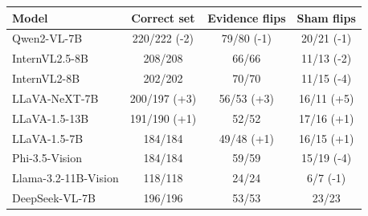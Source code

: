\begin{tabular}{@{}lccc@{}}
\toprule
Model & Correct set & Evidence flips & Sham flips \\
\midrule
Qwen2-VL-7B & 220/222 (-2) & 79/80 (-1) & 20/21 (-1) \\
InternVL2.5-8B & 208/208 & 66/66 & 11/13 (-2) \\
InternVL2-8B & 202/202 & 70/70 & 11/15 (-4) \\
LLaVA-NeXT-7B & 200/197 (+3) & 56/53 (+3) & 16/11 (+5) \\
LLaVA-1.5-13B & 191/190 (+1) & 52/52 & 17/16 (+1) \\
LLaVA-1.5-7B & 184/184 & 49/48 (+1) & 16/15 (+1) \\
Phi-3.5-Vision & 184/184 & 59/59 & 15/19 (-4) \\
Llama-3.2-11B-Vision & 118/118 & 24/24 & 6/7 (-1) \\
DeepSeek-VL-7B & 196/196 & 53/53 & 23/23 \\
\bottomrule
\end{tabular}
